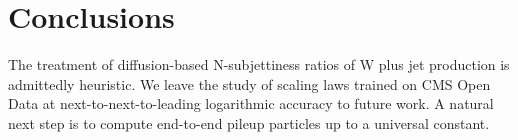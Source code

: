 \section{Conclusions}\label{sec:conclusions}

The treatment of diffusion-based N-subjettiness ratios of W plus jet
production is admittedly heuristic. We leave the study of scaling laws
trained on CMS Open Data at next-to-next-to-leading logarithmic accuracy
to future work. A natural next step is to compute end-to-end pileup
particles up to a universal constant.

